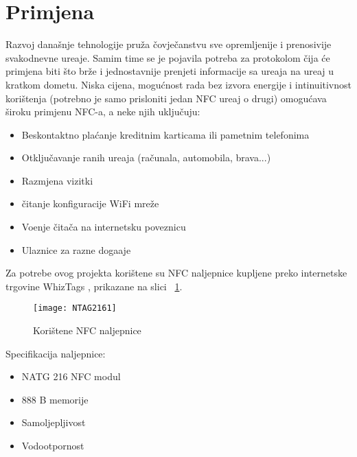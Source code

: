 \section{Primjena}

Razvoj dana\v{s}nje tehnologije pru\v{z}a \v{c}ovje\v{c}anstvu sve opremljenije i prenosivije svakodnevne ure\dj aje. Samim time se je pojavila potreba za protokolom \v{c}ija \'{c}e primjena biti \v{s}to br\v{z}e i jednostavnije  prenjeti informacije sa ure\dj aja na ure\dj aj u kratkom dometu. Niska cijena, mogu\'{c}nost rada bez izvora energije i intinuitivnost kori\v{s}tenja (potrebno je samo prisloniti jedan NFC ure\dj aj o drugi) omogu\'{c}ava \v{s}iroku primjenu NFC-a, a neke njih uklju\v{c}uju:

\begin{itemize}
	\item Beskontaktno pla\'{c}anje kreditnim karticama ili pametnim telefonima
	\item Otklju\v{c}avanje ranih ure\dj aja (ra\v{c}unala, automobila, brava...)
	\item Razmjena vizitki
	\item \v{c}itanje konfiguracije WiFi mre\v{z}e
	\item Vo\dj enje \v{c}ita\v{c}a na internetsku poveznicu
	\item Ulaznice za razne doga\dj aje
\end{itemize}

Za potrebe ovog projekta kori\v{s}tene su NFC naljepnice kupljene preko internetske trgovine WhizTags \cite{whiztags}, prikazane na slici  ~\ref{fig:whiztags}.

\begin{figure}[!htbp]
	\begin{center}
 \texttt{[image: NTAG2161]}
 \caption{Kori\v{s}tene NFC naljepnice}
 \label{fig:whiztags}
	\end{center}
\end{figure}

Specifikacija naljepnice:

\begin{itemize}
	\item NATG 216 NFC modul \cite{nat_modul}
	\item 888 B memorije
	\item Samoljepljivost
	\item Vodootpornost
\end{itemize}











